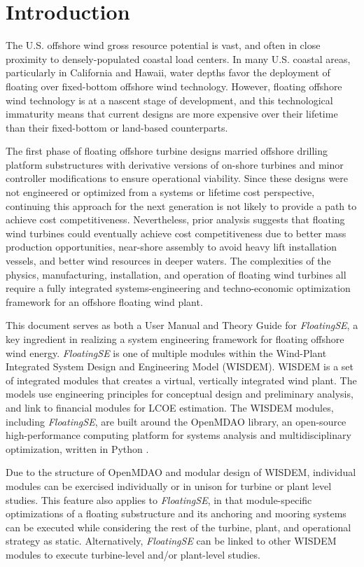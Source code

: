 \chapter{Introduction}
\label{sec:intro}
The U.S. offshore wind gross resource potential is vast, and often in
close proximity to densely-populated coastal load centers. In many
U.S. coastal areas, particularly in California and Hawaii, water depths
favor the deployment of floating over fixed-bottom offshore wind
technology. However, floating offshore wind technology is at a nascent
stage of development, and this technological immaturity means that
current designs are more expensive over their lifetime than their
fixed-bottom or land-based counterparts.

The first phase of floating offshore turbine designs married offshore
drilling platform substructures with derivative versions of on-shore
turbines and minor controller modifications to ensure operational
viability.  Since these designs were not engineered or optimized from a
systems or lifetime cost perspective, continuing this approach for the
next generation is not likely to provide a path to achieve cost
competitiveness. Nevertheless, prior analysis suggests that floating
wind turbines could eventually achieve cost competitiveness due to
better mass production opportunities, near-shore assembly to avoid heavy
lift installation vessels, and better wind resources in deeper
waters. The complexities of the physics, manufacturing, installation,
and operation of floating wind turbines all require a fully integrated
systems-engineering and techno-economic optimization framework for an
offshore floating wind plant.

This document serves as both a User Manual and Theory Guide for
\textit{FloatingSE}, a key ingredient in realizing a system engineering
framework for floating offshore wind energy. \textit{FloatingSE} is one
of multiple modules within the Wind-Plant Integrated System Design and
Engineering Model (WISDEM).  WISDEM is a set of integrated modules that
creates a virtual, vertically integrated wind plant. The models use
engineering principles for conceptual design and preliminary analysis,
and link to financial modules for LCOE estimation.  The WISDEM modules,
including \textit{FloatingSE}, are built around the OpenMDAO library, an
open-source high-performance computing platform for systems analysis and
multidisciplinary optimization, written in Python \citep{openmdao}.

Due to the structure of OpenMDAO and modular design of WISDEM, individual
modules can be exercised individually or in unison for turbine or plant
level studies.  This feature also applies to \textit{FloatingSE}, in
that module-specific optimizations of a floating substructure and its
anchoring and mooring systems can be executed while considering the rest
of the turbine, plant, and operational strategy as static.
Alternatively, \textit{FloatingSE} can be linked to other WISDEM modules
to execute turbine-level and/or plant-level studies.

